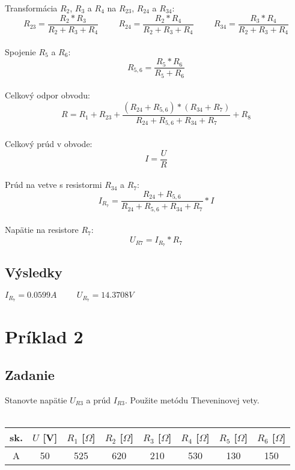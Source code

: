 \documentclass[10pt,a4paper]{article}
\begin{document}
Transformácia $R_2$, $R_3$ a $R_4$ na $R_{23}$, $R_{24}$ a $R_{34}$:
\\
\begin{equation*}
R_{23} = \frac{R_2*R_3}{R_2+R_3+R_4} \hspace{1cm} R_{24} = \frac{R_2*R_4}{R_2+R_3+R_4} \hspace{1cm} R_{34} = \frac{R_3*R_4}{R_2+R_3+R_4}
\end{equation*}
\\
Spojenie $R_5$ a $R_6$:
\\
\begin{equation*}
R_{5,6} = \frac{R_5*R_6}{R_5+R_6}
\end{equation*}
\\
Celkový odpor obvodu:
\\
\begin{equation*}
R = R_1 + R_{23} + \frac{(R_{24}+R_{5,6})*(R_{34}+R_7)}{R_{24}+R_{5,6}+R_{34}+R_7} + R_8
\end{equation*}
\\
Celkový prúd v obvode:
\\
\begin{equation*}
I = \frac{U}{R}
\end{equation*}
\\
Prúd na vetve s resistormi $R_{34}$ a $R_7$:
\\
\begin{equation*}
I_{R_7} = \frac{R_{24}+R_{5,6}}{R_{24}+R_{5,6}+R_{34}+R_7}*I
\end{equation*}
\\
Napätie na resistore $R_7$:
\\
\begin{equation*}
U_{R7} = I_{R_7}*R_7
\end{equation*}

\subsection{Výsledky}

$I_{R_7} = 0.0599 A \hspace{1cm} U_{R_7} = 14.3708 V$

\section{Príklad 2}
\subsection{Zadanie}
Stanovte napätie $U_{R3}$ a prúd $I_{R3}$. Použite metódu Theveninovej vety.
\\ \\
\begin{tabular}{|c|c|c|c|c|c|c|c|}
\hline sk. & $U$ [V] & $R_1$ [$\Omega$] & $R_2$ [$\Omega$] & $R_3$ [$\Omega$] & $R_4$ [$\Omega$] & $R_5$ [$\Omega$] & $R_6$ [$\Omega$]\\
\hline A & 50 & 525 & 620 & 	210 & 530 & 130 & 150\\
\hline
\end{tabular}
\end{document}
